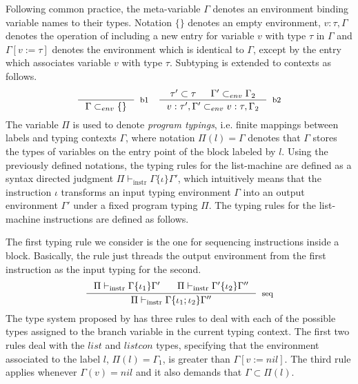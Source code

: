 \documentclass[sigconf]{acmart}
\theoremstyle{definition}
\begin{document}
Following common practice, the meta-variable $\Gamma$ denotes an
environment binding variable names to their types. Notation $\{\}$ denotes an empty environment, $v : \tau , \Gamma$
denotes the operation of including a new entry for variable $v$ with type $\tau$
in $\Gamma$ and $\Gamma [v := \tau]$ denotes the environment which is identical to $\Gamma$, except
by the entry which associates variable $v$ with type $\tau$.
Subtyping is extended to contexts as follows.
\[
\begin{array}{cc}
  \inference{}
            {\Gamma \subset_{env} \{\}}[b1]
  &
  \inference{\tau' \subset \tau & \Gamma' \subset_{env} \Gamma_2}
            {v : \tau' , \Gamma' \subset_{env} v : \tau , \Gamma_2}
            [b2]
\end{array}
\]
The variable $\Pi$ is used to denote \emph{program typings}, i.e. finite mappings between
labels and typing contexts $\Gamma$, where notation $\Pi(l) = \Gamma$ denotes that
$\Gamma$ stores the types of variables on the entry point of the block labeled by $l$.
Using the previously defined notations, the typing rules for the list-machine are defined
as a syntax directed judgment $\Pi \vdash_{\text{instr}} \Gamma \{ \iota \} \Gamma'$,
which intuitively means that the instruction $\iota$ transforms an input typing environment
$\Gamma$ into an output environment $\Gamma'$ under a fixed program typing $\Pi$. The typing
rules for the list-machine instructions are defined as follows.

The first typing rule we consider is the one for sequencing instructions inside a block. Basically,
the rule just threads the output environment from the first instruction as the input typing for the
second.
\[
\inference{\Pi \vdash_{\text{instr}} \Gamma\{ \iota_1 \}\Gamma'\:\:\:\:\:\:\:\:\Pi \vdash_{\text{instr}} \Gamma'\{ \iota_2 \}\Gamma''}
          {\Pi \vdash_{\text{instr}} \Gamma\{ \iota_1 ; \iota_2 \}\Gamma''}[seq]
\]
The type system proposed by \citet{Appel07} has three rules to deal with each of the possible
types assigned to the branch variable in the current typing context. The first two rules deal with the $list$ and $listcon$
types, specifying that the environment associated to the label $l$, $\Pi(l) = \Gamma_1$, is greater than
$\Gamma[v := nil]$. The third rule applies whenever $\Gamma(v) = nil$ and it also demands that $\Gamma \subset \Pi(l)$.
\end{document}
